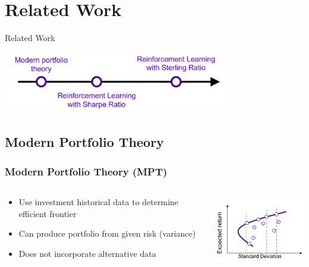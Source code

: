 \section{Related Work}

\begin{frame}{Related Work}
       \tableofcontents[sectionstyle=show/hide, hideothersubsections]
    \begin{center}
    \includegraphics[width=10cm]{images/related.png}
    \end{center}
\end{frame}

\subsection{Modern Portfolio Theory}
\begin{frame}
\frametitle{Modern Portfolio Theory (MPT)}
\begin{columns}
\begin{column}{0.55\textwidth}
\begin{itemize}
    \item Use investment historical data to determine efficient frontier
    \item Can produce portfolio from given risk (variance)
    \item \alert{Does not incorporate alternative data}

\end{itemize}
\end{column}
\begin{column}{0.45\textwidth}
\begin{center}
\includegraphics[width=4.8cm]{images/mpt_risk.png}
\end{center}
\end{column}
\end{columns}
\end{frame}


